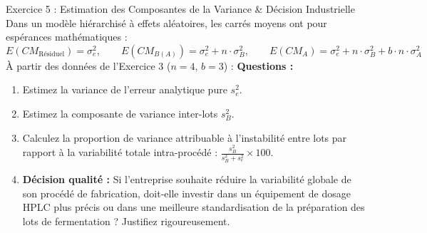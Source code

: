 \documentclass[11pt,a4paper]{article}
\begin{document}
\begin{exercicebox}{Exercice 5 : Estimation des Composantes de la Variance \& Décision Industrielle}
Dans un modèle hiérarchisé à effets aléatoires, les carrés moyens ont pour espérances mathématiques :
\begin{equation*}
  E(CM_{\text{Résiduel}}) = \sigma_e^2, \qquad E(CM_{B(A)}) = \sigma_e^2 + n \cdot \sigma_B^2, \qquad E(CM_A) = \sigma_e^2 + n \cdot \sigma_B^2 + b \cdot n \cdot \sigma_A^2
\end{equation*}
À partir des données de l'Exercice 3 ($n = 4$, $b = 3$) :
\textbf{Questions :}
\begin{enumerate}[label=\textbf{\alph*.}]
  \item Estimez la variance de l'erreur analytique pure $s_e^2$.
  \item Estimez la composante de variance inter-lots $s_B^2$.
  \item Calculez la proportion de variance attribuable à l'instabilité entre lots par rapport à la variabilité totale intra-procédé : $\frac{s_B^2}{s_B^2 + s_e^2} \times 100$.
  \item \textbf{Décision qualité :} Si l'entreprise souhaite réduire la variabilité globale de son procédé de fabrication, doit-elle investir dans un équipement de dosage HPLC plus précis ou dans une meilleure standardisation de la préparation des lots de fermentation ? Justifiez rigoureusement.
\end{enumerate}
\end{exercicebox}
\end{document}
